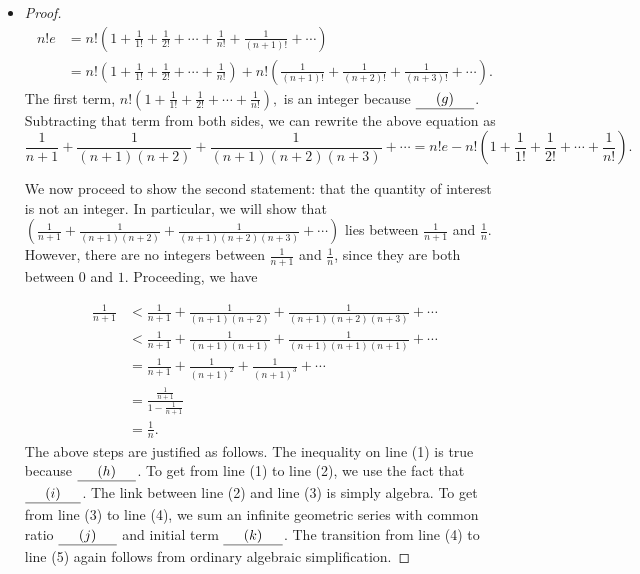 \documentclass[11pt]{article}
\newcounter{tasknumb}
\newcommand{\tasknumb}[1]{\refstepcounter{tasknumb}\textmd{\textbf{$\fbox{$\fbox{Task \thetasknumb}$}$}}#1}
\newenvironment{task}[1][]%
 {\begin{itemize}
 \item[\tasknumb{#1}]  }
{
    \end{itemize}    }%
\begin{document}
\begin{task}
\begin{proof}
\begin{align*} n!e&=n!\left( 1+\frac{1}{1!}+\frac{1}{2!}+\cdots +\frac{1}{n!}+\frac{1}{(n+1)!}+\cdots \right) \\
&=n!\left( 1+\frac{1}{1!}+\frac{1}{2!}+\cdots +\frac{1}{n!}\right) + n!\left(\frac{1}{(n+1)!} +\frac{1}{(n+2)!}+\frac{1}{(n+3)!}+\cdots\right).\end{align*} The first term, $n!\left( 1+\frac{1}{1!}+\frac{1}{2!}+\cdots +\frac{1}{n!}\right),$ is an integer because $\underline{\hspace*{.2in}(g)\hspace*{.2in}}$.  Subtracting that term from both sides, we can rewrite the above equation as $$\frac{1}{n+1}+\frac{1}{(n+1)(n+2)}+\frac{1}{(n+1)(n+2)(n+3)}+\cdots = n!e - n!\left( 1+\frac{1}{1!}+\frac{1}{2!}+\cdots +\frac{1}{n!}\right). $$


\vspace{.1in}

We now proceed to show the second statement: that the quantity of interest is not an integer.  In particular, we will show that  $\left( \frac{1}{n+1}+ \frac{1}{(n+1)(n+2)}+\frac{1}{(n+1)(n+2)(n+3)}+\cdots\right)$ lies between $\frac{1}{n+1}$ and 
$\frac{1}{n}$.  However, there are no integers between $\frac{1}{n+1}$ and
$\frac{1}{n}$, since they are both between $0$ and $1$.  Proceeding, we have

\begin{align}
\frac{1}{n+1} &< \frac{1}{n+1}+ \frac{1}{(n+1)(n+2)}+\frac{1}{(n+1)(n+2)(n+3)}+\cdots \\
 &< \frac{1}{n+1}+ \frac{1}{(n+1)(n+1)}+\frac{1}{(n+1)(n+1)(n+1)}+\cdots \\
 &= \frac{1}{n+1}+ \frac{1}{(n+1)^2}+\frac{1}{(n+1)^3}+\cdots \\
 &= \frac{\frac{1}{n+1}}{1-\frac{1}{n+1}} \\
 &= \frac{1}{n}.
 \end{align} The above steps are justified as follows.  The inequality on line (1) is true because $\underline{\hspace*{.2in}(h)\hspace*{.2in}}$.  To get from line (1) to line (2), we use the fact that $\underline{\hspace*{.2in}(i)\hspace*{.2in}}$.  The link between line (2) and line (3) is simply algebra.  To get from line (3) to line (4), we sum an infinite geometric series with common ratio $\underline{\hspace*{.2in}(j)\hspace*{.2in}}$ and initial term $\underline{\hspace*{.2in}(k)\hspace*{.2in}}$.  The transition from line (4) to line (5) again follows from ordinary algebraic simplification.


\end{proof}
\end{task}
\end{document}
